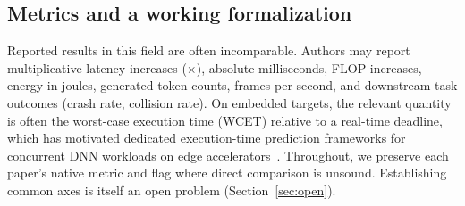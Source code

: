 \documentclass[acmsmall,screen,review,nonacm]{acmart}
\begin{document}
\subsection{Metrics and a working formalization}
\label{sec:metrics}
Reported results in this field are often incomparable. Authors may report multiplicative latency increases ($\times$), absolute milliseconds, FLOP increases, energy in joules, generated-token counts, frames per second, and downstream task outcomes (crash rate, collision rate). On embedded targets, the relevant quantity is often the worst-case execution time (WCET) relative to a real-time deadline, which has motivated dedicated execution-time prediction frameworks for concurrent DNN workloads on edge accelerators~\cite{goel2024express}. Throughout, we preserve each paper's native metric and flag where direct comparison is unsound. Establishing common axes is itself an open problem (Section~\ref{sec:open}).
\end{document}
